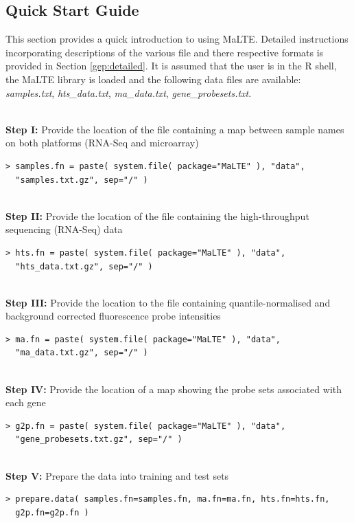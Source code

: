 \documentclass[a4paper,12pt]{article}
\begin{document}
\subsection{Quick Start Guide}
\label{gep:quick}
This section provides a quick introduction to using \textsf{MaLTE}. Detailed instructions incorporating descriptions of the various file and there respective formats is provided in Section \ref{gep:detailed}. It is assumed that the user is in the \textsf{R} shell, the \textsf{MaLTE} library is loaded and the following data files are available: \textit{samples.txt}, \textit{hts\_data.txt}, \textit{ma\_data.txt}, \textit{gene\_probesets.txt}.

\noindent\\
\textbf{Step I:} Provide the location of the file containing a map between sample names on both platforms (RNA-Seq and microarray)
\begin{verbatim}
> samples.fn = paste( system.file( package="MaLTE" ), "data", 
  "samples.txt.gz", sep="/" )
\end{verbatim}

\noindent\\
\textbf{Step II:} Provide the location of the file containing the high-throughput sequencing (RNA-Seq) data
\begin{verbatim}
> hts.fn = paste( system.file( package="MaLTE" ), "data", 
  "hts_data.txt.gz", sep="/" )
\end{verbatim}

\noindent\\
\textbf{Step III:} Provide the location to the file containing quantile-normalised and background corrected fluorescence probe intensities
\begin{verbatim}
> ma.fn = paste( system.file( package="MaLTE" ), "data", 
  "ma_data.txt.gz", sep="/" )
\end{verbatim}

\noindent\\
\textbf{Step IV:} Provide the location of a map showing the probe sets associated with each gene
\begin{verbatim}
> g2p.fn = paste( system.file( package="MaLTE" ), "data", 
  "gene_probesets.txt.gz", sep="/" )
\end{verbatim}

\noindent\\
\textbf{Step V:} Prepare the data into training and test sets
\begin{verbatim}
> prepare.data( samples.fn=samples.fn, ma.fn=ma.fn, hts.fn=hts.fn, 
  g2p.fn=g2p.fn )
\end{verbatim}
\end{document}
